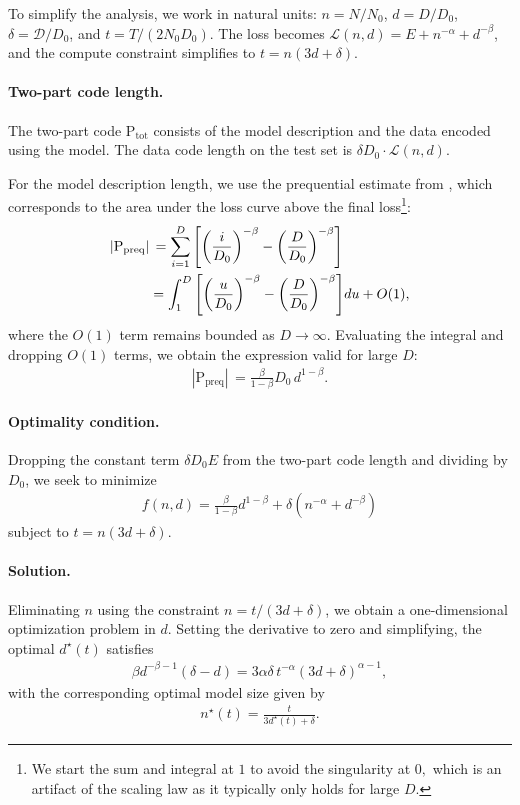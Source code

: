 \documentclass[twoside]{article}
\renewcommand{\L}{\mathcal{L}}
\renewcommand{\L}{\mathcal{L}}
\begin{document}
To simplify the analysis, we work in natural units: $n = N/N_0$, $d = D/D_0$, $\delta = \mathcal{D}/D_0$, and $t = T/(2N_0 D_0)$. The loss becomes $\L(n,d) = E + n^{-\alpha} + d^{-\beta}$, and the compute constraint simplifies to $t = n(3d + \delta)$.

\paragraph{Two-part code length.} The two-part code $\mathrm{P}_{\mathrm{tot}}$ consists of the model description and the data encoded using the model. The data code length on the test set is $\delta D_0 \cdot \L(n,d)$.

For the model description length, we use the prequential estimate from , which corresponds to the area under the loss curve above the final loss\footnote{We start the sum and integral at $1$ to avoid the singularity at $0,$ which is an artifact of the scaling law as it typically only holds for large $D.$}:
\begin{align}
    |\mathrm{P}_{\mathrm{preq}}| &\,= \sum_{i=1}^{D} \qty[ \qty(\frac{i}{D_0})^{-\beta} - \qty(\frac{D}{D_0})^{-\beta} ] \nonumber\\
    &= \int_1^D \qty[ \qty(\frac{u}{D_0})^{-\beta} - \qty(\frac{D}{D_0})^{-\beta} ] du + O(1),
\end{align}
where the $O(1)$ term remains bounded as $D \to \infty$. Evaluating the integral and dropping $O(1)$ terms, we obtain the expression valid for large $D$:
\begin{align}
    |\mathrm{P}_{\mathrm{preq}}| \,= \frac{\beta}{1-\beta} D_0 \, d^{1-\beta}.
\end{align}

\paragraph{Optimality condition.} Dropping the constant term $\delta D_0 E$ from the two-part code length and dividing by $D_0$, we seek to minimize
\begin{align}
    f(n, d) = \frac{\beta}{1-\beta} d^{1-\beta} + \delta (n^{-\alpha} + d^{-\beta})
\end{align}
subject to $t = n(3d + \delta)$.

\paragraph{Solution.} Eliminating $n$ using the constraint $n = t/(3d + \delta)$, we obtain a one-dimensional optimization problem in $d$. Setting the derivative to zero and simplifying, the optimal $d^\star(t)$ satisfies
\begin{align} \label{eq:scaling-foc}
    \beta d^{-\beta-1} (\delta - d) = 3\alpha \delta \, t^{-\alpha} (3d + \delta)^{\alpha-1},
\end{align}
with the corresponding optimal model size given by
\begin{align}
    n^\star(t) = \frac{t}{3d^\star(t) + \delta}.
\end{align}
\end{document}
